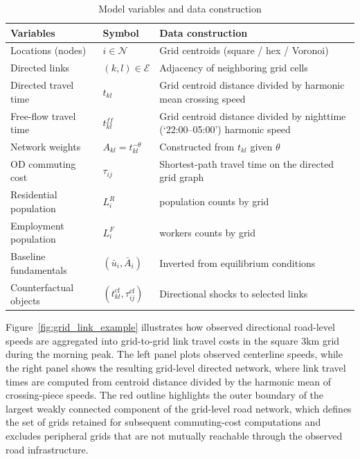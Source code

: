 \documentclass[12pt]{article}
\begin{document}
	\begin{table}[htbp]\centering
		\caption{Model variables and data construction}
		\label{tab:data_mapping}
		\begin{tabular}{lll}
			\hline
			Variables & Symbol & Data construction \\
			\hline
			Locations (nodes) 
			& $i\in\mathcal N$ 
			& Grid centroids (square / hex / Voronoi) \\
			
			Directed links 
			& $(k,l)\in\mathcal E$ 
			& Adjacency of neighboring grid cells \\
			
			Directed travel time 
			& $t_{kl}$ 
			& Grid centroid distance divided by harmonic mean crossing speed \\

			Free-flow travel time
			& $t_{kl}^{ff}$
			& Grid centroid distance divided by nighttime (`22:00--05:00') harmonic speed \\
			
			Network weights 
			& $A_{kl}=t_{kl}^{-\theta}$ 
			& Constructed from $t_{kl}$ given $\theta$ \\
			
			OD commuting cost 
			& $\tau_{ij}$ 
			& Shortest-path travel time on the directed grid graph \\
			
			Residential population 
			& $L_i^{R}$ 
			&  population counts by grid \\
			
			Employment population 
			& $L_i^{F}$ 
			&  workers counts by grid \\
			
			Baseline fundamentals 
			& $(\bar u_i,\bar A_i)$ 
			& Inverted from equilibrium conditions \\
			
			Counterfactual objects 
			& $(t_{kl}^{\mathrm{cf}},\tau_{ij}^{\mathrm{cf}})$ 
			& Directional shocks to selected links \\
			\hline
		\end{tabular}
	\end{table}
	
	Figure~\ref{fig:grid_link_example} illustrates how observed directional road-level speeds are aggregated into grid-to-grid link travel costs in the square 3km grid during the morning peak. The left panel plots observed centerline speeds, while the right panel shows the resulting grid-level directed network, where link travel times are computed from centroid distance divided by the harmonic mean of crossing-piece speeds. The red outline highlights the outer boundary of the largest weakly connected component of the grid-level road network, which defines the set of grids retained for subsequent commuting-cost computations and excludes peripheral grids that are not mutually reachable through the observed road infrastructure.
	
\end{document}
